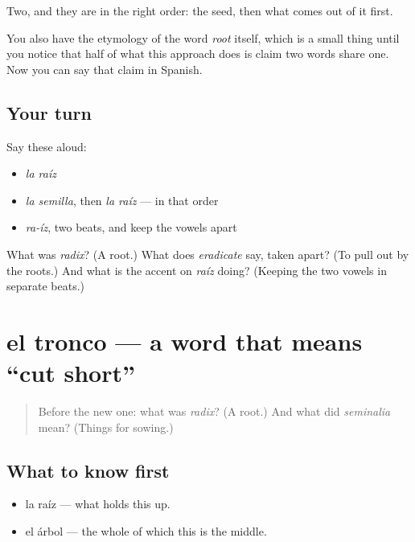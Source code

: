 \begin{grammarlens}[title={What you've built}]
Two, and they are in the right order: the seed, then what comes out of it first.

You also have the etymology of the word \emph{root} itself, which is a small thing until you notice that half of what this approach does is claim two words share one. Now you can say that claim in Spanish.
\end{grammarlens}

\subsection*{Your turn}
Say these aloud:

\begin{itemize}
\raggedright
  \item \emph{la raíz}
  \item \emph{la semilla}, then \emph{la raíz} — in that order
  \item \emph{ra-íz}, two beats, and keep the vowels apart
\end{itemize}

\begin{tcolorbox}[breakable,colback=teal!4,colframe=teal!35!black,title={Before you move on}]
What was \emph{radix}? (A root.) What does \emph{eradicate} say, taken apart? (To pull out by the roots.) And what is the accent on \emph{raíz} doing? (Keeping the two vowels in separate beats.)
\end{tcolorbox}
\section[el tronco]{el tronco — a word that means \textquotedblleft{}cut short\textquotedblright{}}

\label{lesson:ES-C291-tronco}



\begin{quote}
Before the new one: what was \emph{radix}? (A root.) And what did \emph{seminalia} mean? (Things for sowing.)
\end{quote}

\subsection*{What to know first}
\begin{itemize}
\raggedright
  \item la raíz — what holds this up.
  \item el árbol — the whole of which this is the middle.
\end{itemize}

